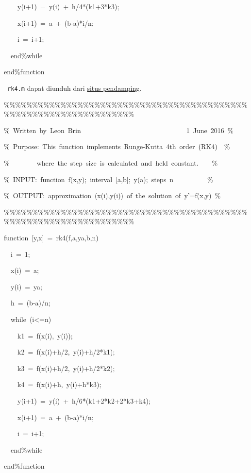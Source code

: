 \begin{description}
\begin{lyxcode}
~~~~y(i+1)~=~y(i)~+~h/4{*}(k1+3{*}k3);

~~~~x(i+1)~=~a~+~(b-a){*}i/n;

~~~~i~=~i+1;

~~end\%while

end\%function
\end{lyxcode}
\item [{\ref{exc:ode-errorAnalysis-4}:}] \texttt{
rk4.m} dapat diunduh dari \href{http://lqbrin.github.io/tea-time-numerical/ancillaries.html}{situs pendamping}.

\begin{lyxcode}
\%\%\%\%\%\%\%\%\%\%\%\%\%\%\%\%\%\%\%\%\%\%\%\%\%\%\%\%\%\%\%\%\%\%\%\%\%\%\%\%\%\%\%\%\%\%\%\%\%\%\%\%\%\%\%\%\%\%\%\%\%\%\%\%\%\%

\%~Written~by~Leon~Brin~~~~~~~~~~~~~~~~~~~~~~~~~~~~~~~1~June~2016~\%

\%~Purpose:~This~function~implements~Runge-Kutta~4th~order~(RK4)~~\%

\%~~~~~~~~where~the~step~size~is~calculated~and~held~constant.~~~~\%

\%~INPUT:~function~f(x,y);~interval~{[}a,b{]};~y(a);~steps~n~~~~~~~~~~\%

\%~OUTPUT:~approximation~(x(i),y(i))~of~the~solution~of~y'=f(x,y)~\%

\%\%\%\%\%\%\%\%\%\%\%\%\%\%\%\%\%\%\%\%\%\%\%\%\%\%\%\%\%\%\%\%\%\%\%\%\%\%\%\%\%\%\%\%\%\%\%\%\%\%\%\%\%\%\%\%\%\%\%\%\%\%\%\%\%\%

function~{[}y,x{]}~=~rk4(f,a,ya,b,n)

~~i~=~1;

~~x(i)~=~a;

~~y(i)~=~ya;

~~h~=~(b-a)/n;

~~while~(i<=n)

~~~~k1~=~f(x(i),~y(i));

~~~~k2~=~f(x(i)+h/2,~y(i)+h/2{*}k1);

~~~~k3~=~f(x(i)+h/2,~y(i)+h/2{*}k2);

~~~~k4~=~f(x(i)+h,~y(i)+h{*}k3);

~~~~y(i+1)~=~y(i)~+~h/6{*}(k1+2{*}k2+2{*}k3+k4);

~~~~x(i+1)~=~a~+~(b-a){*}i/n;

~~~~i~=~i+1;

~~end\%while

end\%function
\end{lyxcode}
\end{description}

